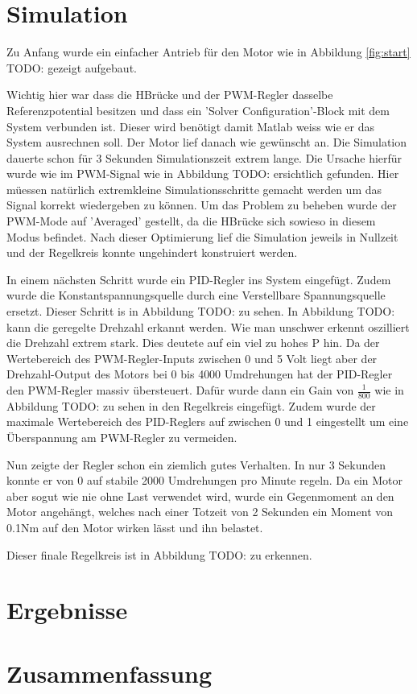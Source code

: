 \documentclass{fhnwreport} %
\begin{document}
\section{Simulation}

Zu Anfang wurde ein einfacher Antrieb für den Motor wie in Abbildung \ref{fig:start} TODO: gezeigt aufgebaut.

Wichtig hier war dass die HBrücke und der PWM-Regler dasselbe Referenzpotential besitzen und dass ein 'Solver Configuration'-Block mit dem System verbunden ist. Dieser wird benötigt damit Matlab weiss wie er das System ausrechnen soll. Der Motor lief danach wie gewünscht an. Die Simulation dauerte schon für 3 Sekunden Simulationszeit extrem lange. Die Ursache hierfür wurde wie im PWM-Signal wie in Abbildung TODO: ersichtlich gefunden. Hier müessen natürlich extremkleine Simulationsschritte gemacht werden um das Signal korrekt wiedergeben zu können.
Um das Problem zu beheben wurde der PWM-Mode auf 'Averaged' gestellt, da die HBrücke sich sowieso in diesem Modus befindet.
Nach dieser Optimierung lief die Simulation jeweils in Nullzeit und der Regelkreis konnte ungehindert konstruiert werden.

In einem nächsten Schritt wurde ein PID-Regler ins System eingefügt. Zudem wurde die Konstantspannungsquelle durch eine Verstellbare Spannungsquelle ersetzt.
Dieser Schritt is in Abbildung TODO: zu sehen.
In Abbildung TODO: kann die geregelte Drehzahl erkannt werden. Wie man unschwer erkennt oszilliert die Drehzahl extrem stark. Dies deutete auf ein viel zu hohes P hin.
Da der Wertebereich des PWM-Regler-Inputs zwischen 0 und 5 Volt liegt aber der Drehzahl-Output des Motors bei 0 bis 4000 Umdrehungen hat der PID-Regler den PWM-Regler massiv übersteuert.
Dafür wurde dann ein Gain von $\frac{1}{800}$ wie in Abbildung TODO: zu sehen in den Regelkreis eingefügt. Zudem wurde der maximale Wertebereich des PID-Reglers auf zwischen 0 und 1 eingestellt um eine Überspannung am PWM-Regler zu vermeiden.

Nun zeigte der Regler schon ein ziemlich gutes Verhalten. In nur 3 Sekunden konnte er von 0 auf stabile 2000 Umdrehungen pro Minute regeln.
Da ein Motor aber sogut wie nie ohne Last verwendet wird, wurde ein Gegenmoment an den Motor angehängt, welches nach einer Totzeit von 2 Sekunden ein Moment von 0.1Nm auf den Motor wirken lässt und ihn belastet.

Dieser finale Regelkreis ist in Abbildung TODO: zu erkennen.

\section{Ergebnisse}



\section{Zusammenfassung}
\end{document}
